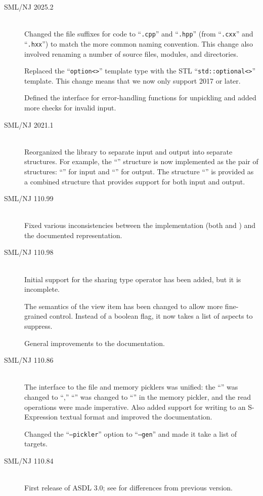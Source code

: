 \begin{description}
  \item[SML/NJ 2025.2]
    \mbox{}\\[0.5em]
    Changed the file suffixes for \Cplusplus{} code to ``\texttt{.cpp}'' and ``\texttt{.hpp}''
    (from ``\texttt{.cxx}'' and ``\texttt{.hxx}'') to match the more common naming convention.
    This change also involved renaming a number of source files, modules, and directories.

    Replaced the ``\texttt{option<>}'' template type with the STL ``\texttt{std::optional<>}''
    template.  This change means that we now only support \Cplusplus{} 2017 or later.

    Defined the interface for error-handling functions for unpickling and added more checks
    for invalid input.

  \item[SML/NJ 2021.1]
    \mbox{}\\[0.5em]
    Reorganized the \sml{} library to separate input and output into separate
    structures.  For example, the ``'' structure is now
    implemented as the pair of structures: ``'' for input
    and ``'' for output.  The structure ``''
    is provided as a combined structure that provides support for both input
    and output.

  \item[SML/NJ 110.99]
    \mbox{}\\[0.5em]
    Fixed various inconsistencies between the implementation (both \Cplusplus{} and
    \sml{}) and the documented representation.

  \item[SML/NJ 110.98]
    \mbox{}\\[0.5em]
    Initial support for the sharing type operator has been added, but it is incomplete.

    The semantics of the  view item has been changed to allow more
    fine-grained control.  Instead of a boolean flag, it now takes a list of
    aspects to suppress.

    General improvements to the documentation.

  \item[SML/NJ 110.86]
    \mbox{}\\[0.5em]
    The interface to the file and memory picklers was unified: the ``''
    was changed to ``,'' ``'' was changed to
    ``'' in the memory pickler, and the read operations were made
    imperative.
    Also added support for writing to an S-Expression textual format and improved
    the documentation.

    Changed the ``\texttt{--pickler}'' option to ``\texttt{--gen}'' and made it take
    a list of targets.

  \item[SML/NJ 110.84]
    \mbox{}\\[0.5em]
    First release of ASDL 3.0; see  for differences from previous
    version.
\end{description}%
